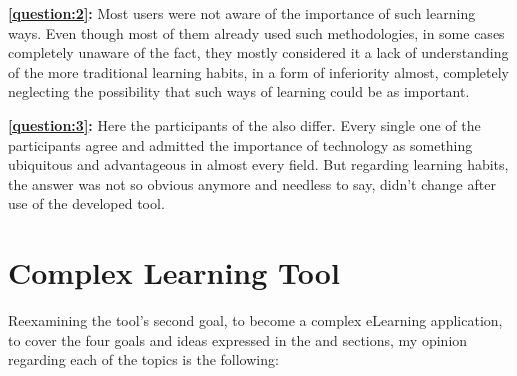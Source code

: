 \textbf{\ref{question:2}:} Most users were not aware of the importance of such learning ways. Even though
most of them already used such methodologies, in some cases completely unaware of the fact, they mostly 
considered it a lack of understanding of the more traditional learning habits, in a form
of inferiority almost, completely neglecting the possibility that such ways of learning could be as 
important.

\textbf{\ref{question:3}:} Here the participants of the also differ. Every single one of the participants 
agree and admitted the importance of technology as something ubiquitous and advantageous in almost every 
field. But regarding learning habits, the answer was not so obvious anymore and needless to say, didn't 
change after use of the developed tool.


\section{Complex Learning Tool}


Reexamining the tool's second goal, to become a complex eLearning application, to cover the four goals
and ideas expressed in the  and  sections, my opinion
regarding each of the topics is the following:

